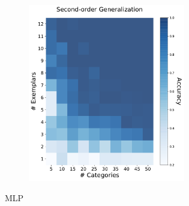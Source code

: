 \begin{figure}[h]
\begin{center}
\begin{subfigure}[b]{0.47\textwidth}
\begin{center}
\begin{subfigure}[b]{0.48\textwidth}
\begin{center}
                        \includegraphics[width=0.98\textwidth]{figures/mlp_2order_accuracy.pdf}
                    \end{center}
                \end{subfigure}
            \end{center}
            \caption{MLP}
            \label{mlp_results}
        \end{subfigure}
        \begin{subfigure}[b]{0.47\textwidth}
            \begin{center}
                \begin{subfigure}[b]{0.48\textwidth}
                    \begin{center}

\end{center}
\end{subfigure}
\end{center}
\end{subfigure}
\end{center}
\end{figure}
